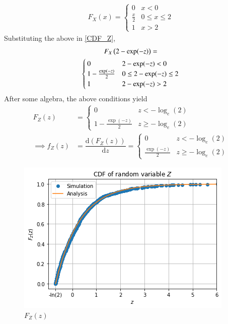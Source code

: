 \documentclass[journal,12pt,twocolumn]{IEEEtran}
\begin{document}
\begin{align}
F_X(x) = 
\begin{cases}
0 &  x < 0 \\
\frac{x}{2} & 0 \leq x \leq 2 \\
1 & x > 2
\end{cases}
\end{align}
%
Substituting the above in \eqref{CDF_Z},
%
\begin{multline}
F_X\left(2- \exp(-z)\right) =
\\
\begin{cases}
0 &  2- \exp(-z) < 0 \\
1- \frac{\exp(-z)}{2} & 0 \leq 2- \exp(-z) \leq 2 \\
1 & 2- \exp(-z) > 2
\end{cases}
\end{multline}
After some algebra, the above conditions yield
\begin{align}
F_Z(z) &= 
\begin{cases}
0 & z < -\log_e (2) \\
1- \frac{\exp(-z)}{2} & z \geq -\log_e (2)
\end{cases}
\label{CDF_Z_Final}\\
\implies f_Z(z)&=\dfrac{\text{d}(F_Z(z))}{\text{d}z}   
=\begin{cases}
0 & z < -\log_e (2) \\
\frac{\exp(-z)}{2} & z \geq -\log_e (2)
\end{cases}
\label{PDF_Z_Final}
\end{align}
\begin{figure}[H]
    \centering
      \includegraphics[width=\columnwidth]{Figures/CDF_Z.png}
     \caption{$F_Z(z)$}
\end{figure}
\end{document}
